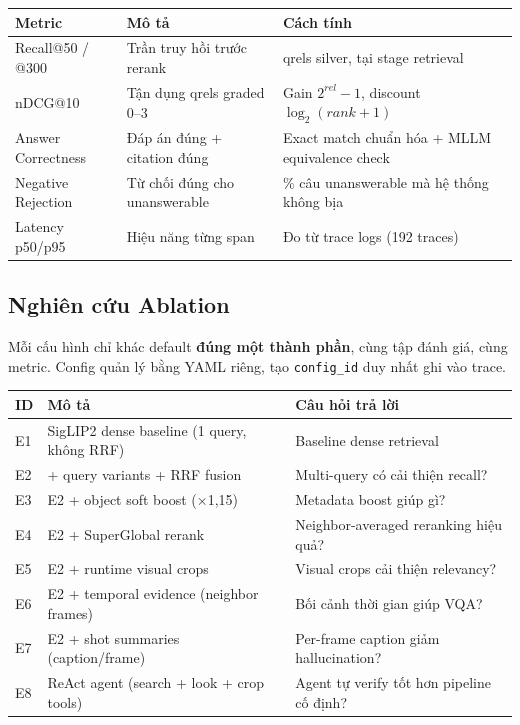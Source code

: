 \documentclass[12pt,a4paper,onecolumn]{article}
\begin{document}
\begin{center}
\begin{tabular}{l l l}
\toprule
Metric & Mô tả & Cách tính \\
\midrule
Recall@50 / @300 & Trần truy hồi trước rerank & qrels silver, tại stage retrieval \\
nDCG@10 & Tận dụng qrels graded 0–3 & Gain $2^{rel} - 1$, discount $\log_2(rank+1)$ \\
Answer Correctness & Đáp án đúng + citation đúng & Exact match chuẩn hóa + MLLM equivalence check \\
Negative Rejection & Từ chối đúng cho unanswerable & \% câu unanswerable mà hệ thống không bịa \\
Latency p50/p95 & Hiệu năng từng span & Đo từ trace logs (192 traces) \\
\bottomrule
\end{tabular}
\end{center}


\subsection{Nghiên cứu Ablation}

Mỗi cấu hình chỉ khác default \textbf{đúng một thành phần}, cùng tập đánh giá, cùng metric. Config quản lý bằng YAML riêng, tạo \texttt{config\_id} duy nhất ghi vào trace.

\begin{center}
\begin{tabular}{l l l}
\toprule
ID & Mô tả & Câu hỏi trả lời \\
\midrule
E1 & SigLIP2 dense baseline (1 query, không RRF) & Baseline dense retrieval \\
E2 & + query variants + RRF fusion & Multi-query có cải thiện recall? \\
E3 & E2 + object soft boost (×1,15) & Metadata boost giúp gì? \\
E4 & E2 + SuperGlobal rerank & Neighbor-averaged reranking hiệu quả? \\
E5 & E2 + runtime visual crops & Visual crops cải thiện relevancy? \\
E6 & E2 + temporal evidence (neighbor frames) & Bối cảnh thời gian giúp VQA? \\
E7 & E2 + shot summaries (caption/frame) & Per-frame caption giảm hallucination? \\
E8 & ReAct agent (search + look + crop tools) & Agent tự verify tốt hơn pipeline cố định? \\
\bottomrule
\end{tabular}
\end{center}
\end{document}
